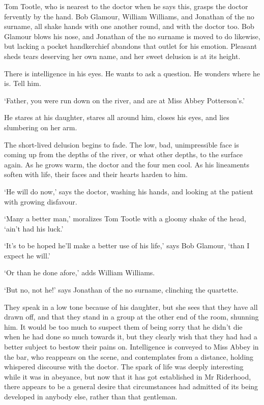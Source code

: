Tom Tootle, who is nearest to the doctor when he says this, grasps
the doctor fervently by the hand. Bob Glamour, William Williams, and
Jonathan of the no surname, all shake hands with one another round, and
with the doctor too. Bob Glamour blows his nose, and Jonathan of the
no surname is moved to do likewise, but lacking a pocket handkerchief
abandons that outlet for his emotion. Pleasant sheds tears deserving her
own name, and her sweet delusion is at its height.

There is intelligence in his eyes. He wants to ask a question. He
wonders where he is. Tell him.

‘Father, you were run down on the river, and are at Miss Abbey
Potterson’s.’

He stares at his daughter, stares all around him, closes his eyes, and
lies slumbering on her arm.

The short-lived delusion begins to fade. The low, bad, unimpressible
face is coming up from the depths of the river, or what other depths, to
the surface again. As he grows warm, the doctor and the four men cool.
As his lineaments soften with life, their faces and their hearts harden
to him.

‘He will do now,’ says the doctor, washing his hands, and looking at the
patient with growing disfavour.

‘Many a better man,’ moralizes Tom Tootle with a gloomy shake of the
head, ‘ain’t had his luck.’

‘It’s to be hoped he’ll make a better use of his life,’ says Bob
Glamour, ‘than I expect he will.’

‘Or than he done afore,’ adds William Williams.

‘But no, not he!’ says Jonathan of the no surname, clinching the
quartette.

They speak in a low tone because of his daughter, but she sees that they
have all drawn off, and that they stand in a group at the other end of
the room, shunning him. It would be too much to suspect them of being
sorry that he didn’t die when he had done so much towards it, but they
clearly wish that they had had a better subject to bestow their pains
on. Intelligence is conveyed to Miss Abbey in the bar, who reappears on
the scene, and contemplates from a distance, holding whispered discourse
with the doctor. The spark of life was deeply interesting while it was
in abeyance, but now that it has got established in Mr Riderhood, there
appears to be a general desire that circumstances had admitted of its
being developed in anybody else, rather than that gentleman.

